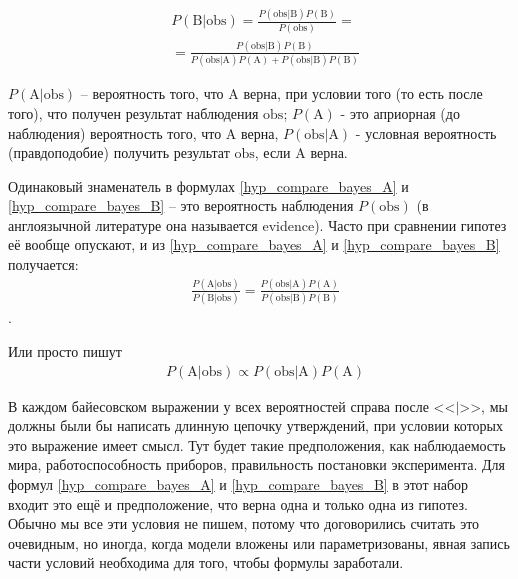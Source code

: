 \documentclass{book}
\begin{document}
\begin{align}\label{hyp_compare_bayes_B}
   &P\left(\text{B|obs}\right)=
   \frac{P\left(\text{obs|B}\right) P\left(\text{B}\right)}{P\left(\text{obs}\right)} = \nonumber \\
   &=\frac{P\left(\text{obs|B}\right) P\left(\text{B}\right)}{P\left(\text{obs|A}\right) P\left(\text{A}\right)+P\left(\text{obs|B}\right) P\left(\text{B}\right)}
\end{align}


$P\left(\text{A|obs}\right)$ -- вероятность того, что $\text{A}$ верна, при условии того (то есть после того), что получен результат наблюдения $\text{obs}$; $P\left(\text{A}\right)$ - это априорная (до наблюдения) вероятность того, что $\text{A}$ верна, $P\left(\text{obs|A}\right)$ - условная вероятность (правдоподобие) получить результат $\text{obs}$, если $\text{A}$ верна.

Одинаковый знаменатель в формулах \eqref{hyp_compare_bayes_A} и \eqref{hyp_compare_bayes_B} -- это вероятность наблюдения $P\left(\text{obs}\right)$ (в англоязычной литературе она называется evidence). Часто при сравнении гипотез её вообще опускают, и из \eqref{hyp_compare_bayes_A} и \eqref{hyp_compare_bayes_B} получается:
\begin{align}\label{hyp_compare_bayes_comp}
   &\frac{P\left(\text{A|obs}\right)}{P\left(\text{B|obs}\right)}=\frac{P\left(\text{obs|A}\right) P\left(\text{A}\right)}{P\left(\text{obs|B}\right) P\left(\text{B}\right)}
\end{align}.

Или просто пишут 
\begin{align}\label{hyp_compare_bayes_null_prop}
   &P\left(\text{A|obs}\right)\propto P\left(\text{obs|A}\right) P\left(\text{A}\right)
\end{align}

  В каждом байесовском выражении у всех вероятностей справа после <<$\text{|}$>>, мы должны были бы написать длинную цепочку утверждений, при условии которых это выражение имеет смысл. Тут будет такие предположения, как наблюдаемость мира, работоспособность приборов, правильность постановки эксперимента. Для формул \eqref{hyp_compare_bayes_A} и \eqref{hyp_compare_bayes_B} в этот набор входит это ещё и предположение, что верна одна и только одна из гипотез. Обычно мы все эти условия не пишем, потому что договорились считать это очевидным, но иногда, когда модели вложены или параметризованы, явная запись части условий необходима для того, чтобы формулы заработали.  
 
\end{document}
